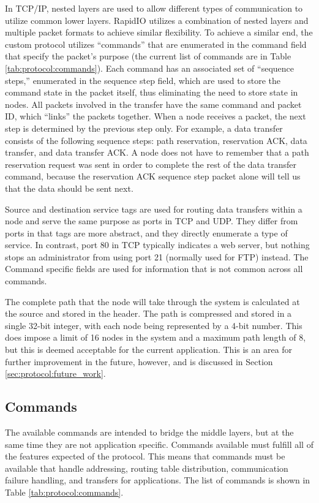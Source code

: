 In TCP/IP, nested layers are used to allow different types of communication to utilize common lower layers. RapidIO utilizes a combination of nested layers and multiple packet formats to achieve similar flexibility. To achieve a similar end, the custom protocol utilizes ``commands'' that are enumerated in the command field that specify the packet's purpose (the current list of commands are in Table \ref{tab:protocol:commands}). Each command has an associated set of ``sequence steps,'' enumerated in the sequence step field, which are used to store the command state in the packet itself, thus eliminating the need to store state in nodes. All packets involved in the transfer have the same command and packet ID, which ``links'' the packets together. When a node receives a packet, the next step is determined by the previous step only. For example, a data transfer consists of the following sequence steps: path reservation, reservation ACK, data transfer, and data transfer ACK. A node does not have to remember that a path reservation request was sent in order to complete the rest of the data transfer command, because the reservation ACK sequence step packet alone will tell us that the data should be sent next. 

Source and destination service tags are used for routing data transfers within a node and serve the same purpose as ports in TCP and UDP. They differ from ports in that tags are more abstract, and they directly enumerate a type of service. In contrast, port 80 in TCP typically indicates a web server, but nothing stops an administrator from using port 21 (normally used for FTP) instead. The Command specific fields are used for information that is not common across all commands. 

The complete path that the node will take through the system is calculated at the source and stored in the header. The path is compressed and stored in a single 32-bit integer, with each node being represented by a 4-bit number. This does impose a limit of 16 nodes in the system and a maximum path length of 8, but this is deemed acceptable for the current application. This is an area for further improvement in the future, however, and is discussed in Section \ref{sec:protocol:future_work}.

\subsection{Commands}\label{sec:protocol:methodology:commands}

The available commands are intended to bridge the middle layers, but at the same time they are not application specific. Commands available must fulfill all of the features expected of the protocol. This means that commands must be available that handle addressing, routing table distribution, communication failure handling, and transfers for applications. The list of commands is shown in Table \ref{tab:protocol:commands}.

